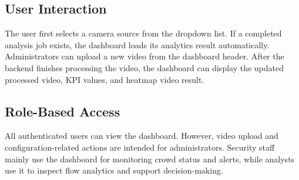 \documentclass[12pt,a4paper]{report}
\begin{document}
\subsection{User Interaction}

The user first selects a camera source from the dropdown list. If a completed analysis job exists, the dashboard loads its analytics result automatically. Administrators can upload a new video from the dashboard header. After the backend finishes processing the video, the dashboard can display the updated processed video, KPI values, and heatmap video result.

\subsection{Role-Based Access}

All authenticated users can view the dashboard. However, video upload and configuration-related actions are intended for administrators. Security staff mainly use the dashboard for monitoring crowd status and alerts, while analysts use it to inspect flow analytics and support decision-making.

\end{document}
